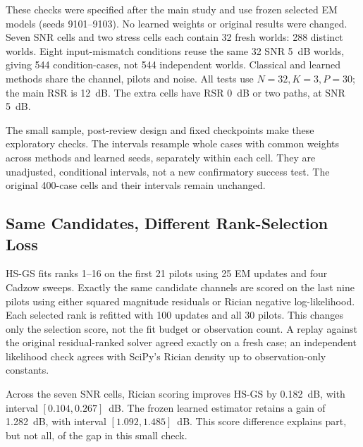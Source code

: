 These checks were specified after the main study and use frozen selected
EM models (seeds 9101--9103). No learned weights or original results were
changed. Seven SNR cells and two stress cells each contain 32 fresh
worlds: 288 distinct worlds. Eight input-mismatch conditions reuse the
same 32 SNR 5~dB worlds, giving 544 condition-cases, not 544 independent
worlds. Classical and learned methods share the channel, pilots and noise.
All tests use $N=32,K=3,P=30$; the main RSR is 12~dB. The extra cells
have RSR 0~dB or two paths, at SNR 5~dB.

The small sample, post-review design and fixed checkpoints make these
exploratory checks. The intervals resample whole cases with common weights
across methods and learned seeds, separately within each cell. They are
unadjusted, conditional intervals, not a new confirmatory success test.
The original 400-case cells and their intervals remain unchanged.

\subsection{Same Candidates, Different Rank-Selection Loss}
HS-GS fits ranks 1--16 on the first 21 pilots using 25 EM updates and four
Cadzow sweeps. Exactly the same candidate channels are scored on the last
nine pilots using either squared magnitude residuals or Rician negative
log-likelihood. Each selected rank is refitted with 100 updates and all
30 pilots. This changes only the selection score, not the fit budget or
observation count. A replay against the original residual-ranked solver
agreed exactly on a fresh case; an independent likelihood check agrees
with SciPy's Rician density up to observation-only constants.

Across the seven SNR cells, Rician scoring improves HS-GS by 0.182~dB, with interval $[0.104,0.267]$~dB. 
The frozen learned estimator retains a gain of 1.282~dB, with interval $[1.092,1.485]$~dB. This score difference explains part, but not all, of the gap in this small check.

